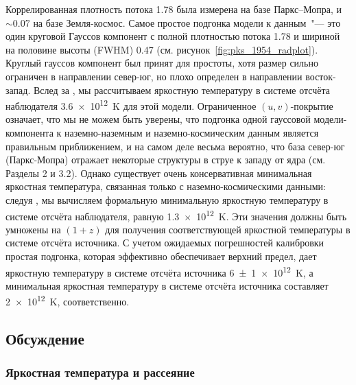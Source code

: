 Коррелированная плотность потока \SI{1.78}{\jansky} была измерена на базе Паркс--Мопра, и
$\sim$\SI{0.07}{\jansky} на базе Земля-космос. Самое простое подгонка модели к данным~"---
это один круговой Гауссов компонент с полной плотностью потока \SI{1.78}{\jansky} и шириной на
половине высоты (FWHM) \SI{0.47}{\mas} (см. рисунок~\ref{fig:pks_1954_radplot}). Круглый гауссов
компонент был принят для простоты, хотя размер сильно ограничен в направлении север-юг, но плохо
определен в направлении восток-запад. Вслед за \cite{Kovalev_2005}, мы рассчитываем яркостную
температуру в системе отсчёта наблюдателя \SI{3.6e12}{\kelvin} для этой модели. Ограниченное $(u,
v)$-покрытие означает, что мы не можем быть уверены, что подгонка одной гауссовой модели-компонента
к наземно-наземным и наземно-космическим данным является правильным приближением, и на самом деле
весьма вероятно, что база север-юг (Паркс-Мопра) отражает некоторые структуры в струе к западу от
ядра (см. Разделы 2 и 3.2). Однако существует очень консервативная минимальная яркостная
температура, связанная только с наземно-космическими данными: следуя \cite{Lobanov_2015a}, мы
вычисляем формальную минимальную яркостную температуру в системе отсчёта наблюдателя, равную
\SI{1.3e12}{\kelvin}. Эти значения должны быть умножены на $(1 + z)$ для получения соответствующей
яркостной температуры в системе отсчёта источника. С учетом ожидаемых погрешностей калибровки
простая подгонка, которая эффективно обеспечивает верхний предел, дает яркостную температуру в
системе отсчёта источника \SI{6(1)e12}{\kelvin}, а минимальная яркостная температуру в системе
отсчёта источника составляет \SI{2e12}{\kelvin}, соответственно.

\subsection{Обсуждение}

\subsubsection{Яркостная температура и рассеяние}
